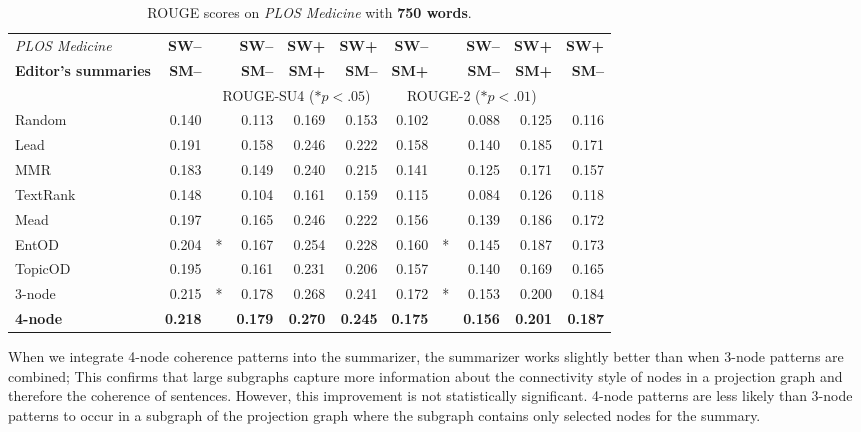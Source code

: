 \begin{table}[!ht]
	\begin{center}
		\begin{tabular}{lr@{}lrrr||r@{}lrrr}
		\toprule
		\emph{PLOS Medicine}& \textbf{SW--}& & \textbf{SW--} & \textbf{SW+} & \textbf{SW+}& \textbf{SW--} & & \textbf{SW--} & \textbf{SW+} & \textbf{SW+} \\
		\textbf{Editor's summaries}  & \textbf{SM--} & & \textbf{SM--} &  \textbf{SM+} & \textbf{SM--} &  \textbf{SM+}  & & \textbf{SM--} &  \textbf{SM+}  & \textbf{SM--} \\
		\midrule
		&& \multicolumn{4}{c||}{ROUGE-SU4 ($\ast p<.05$)} & \multicolumn{4}{c}{ROUGE-2 ($\ast p<.01$)}\\
		\midrule
		Random &  0.140& & 0.113 & 0.169  & 0.153 &  0.102 & & 0.088 & 0.125 & 0.116 \\
		Lead & 0.191 & & 0.158 & 0.246 & 0.222  & 0.158 & & 0.140 &0.185 &0.171   \\
		MMR & 0.183& & 0.149 & 0.240 & 0.215 & 0.141 & & 0.125 & 0.171 &0.157 \\
		TextRank & 0.148& & 0.104 & 0.161 & 0.159 & 0.115 & & 0.084 &0.126 & 0.118\\
		Mead & 0.197 & & 0.165 & 0.246 & 0.222& 0.156 & &0.139 & 0.186 & 0.172 \\
		EntOD & 0.204&* & 0.167 & 0.254& 0.228 &0.160 &* & 0.145 &0.187 & 0.173\\
		TopicOD & 0.195 & &0.161 & 0.231 &0.206 & 0.157 &  & 0.140 &0.169 & 0.165 \\
		3-node &0.215& * &0.178& 0.268& 0.241& 0.172 & * & 0.153 & 0.200 &0.184 \\
		\textbf{4-node} & \textbf{0.218}& & \textbf{0.179} & \textbf{0.270} & \textbf{0.245}  & \textbf{0.175} & & \textbf{0.156} & \textbf{0.201} & \textbf{0.187} \\
		\bottomrule
		\end{tabular}
	\end{center}
	\caption{ROUGE scores on \emph{PLOS Medicine} with \textbf{750 words}.}
	\label{tab:plos-750words}
\end{table}

When we integrate 4-node coherence patterns into the summarizer, the summarizer works slightly better than when 3-node patterns are combined; This confirms that large subgraphs capture more information about the connectivity style of nodes in a projection graph and therefore the coherence of sentences.  
However, this improvement is not statistically significant. 
4-node patterns are less likely than 3-node patterns to occur in a subgraph of the projection graph where the subgraph contains only selected nodes for the summary. 

